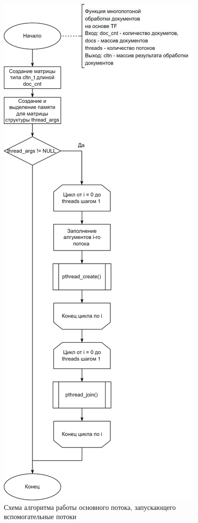 \clearpage

\begin{figure}[h]
	\centering
	\includegraphics[height=0.85\textheight]{img/parallel.png}
	\caption{Схема алгоритма работы основного потока, запускающего вспомогательные потоки}
	\label{fig:parallel}
\end{figure}

